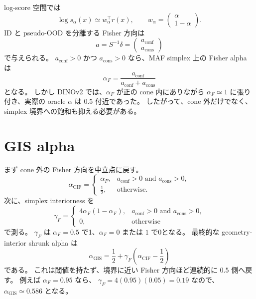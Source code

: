 \documentclass[a4paper,11pt]{ltjsarticle}
\begin{document}
log-score 空間では
\begin{equation}
    \log s_{\alpha}(x)
    \simeq
    w_\alpha^\top r(x),
    \qquad
    w_\alpha =
    \begin{pmatrix}
        \alpha\\
        1-\alpha
    \end{pmatrix}.
\end{equation}
ID と pseudo-OOD を分離する Fisher 方向は
\begin{equation}
    a=S^{-1}\delta
    =
    \begin{pmatrix}
        a_{\mathrm{conf}}\\
        a_{\mathrm{cons}}
    \end{pmatrix}
\end{equation}
で与えられる。
$a_{\mathrm{conf}}>0$ かつ $a_{\mathrm{cons}}>0$ なら、MAF simplex 上の
Fisher alpha は
\begin{equation}
    \alpha_F
    =
    \frac{a_{\mathrm{conf}}}
         {a_{\mathrm{conf}}+a_{\mathrm{cons}}}
\end{equation}
となる。
しかし DINOv2 では、$\alpha_F$ が正の cone 内にありながら
$\alpha_F\simeq 1$ に張り付き、実際の oracle $\alpha$ は $0.5$ 付近であった。
したがって、cone 外だけでなく、simplex 境界への飽和も抑える必要がある。

\section{GIS alpha}

まず cone 外の Fisher 方向を中立点に戻す。
\begin{equation}
    \alpha_{\mathrm{CIF}}
    =
    \begin{cases}
    \alpha_F,
    & a_{\mathrm{conf}}>0 \text{ and } a_{\mathrm{cons}}>0,\\
    \frac{1}{2},
    & \text{otherwise}.
    \end{cases}
\end{equation}
次に、simplex interiorness を
\begin{equation}
    \gamma_F
    =
    \begin{cases}
    4\alpha_F(1-\alpha_F),
    & a_{\mathrm{conf}}>0 \text{ and } a_{\mathrm{cons}}>0,\\
    0,
    & \text{otherwise}
    \end{cases}
\end{equation}
で測る。
$\gamma_F$ は $\alpha_F=0.5$ で1、$\alpha_F=0$ または $1$ で0となる。
最終的な geometry-interior shrunk alpha は
\begin{equation}
    \boxed{
    \alpha_{\mathrm{GIS}}
    =
    \frac{1}{2}
    +
    \gamma_F
    \left(
        \alpha_{\mathrm{CIF}}-\frac{1}{2}
    \right)}
\end{equation}
である。
これは閾値を持たず、境界に近い Fisher 方向ほど連続的に $0.5$ 側へ戻す。
例えば $\alpha_F=0.95$ なら、
$\gamma_F=4(0.95)(0.05)=0.19$ なので、
$\alpha_{\mathrm{GIS}}\simeq0.586$ となる。
\end{document}
